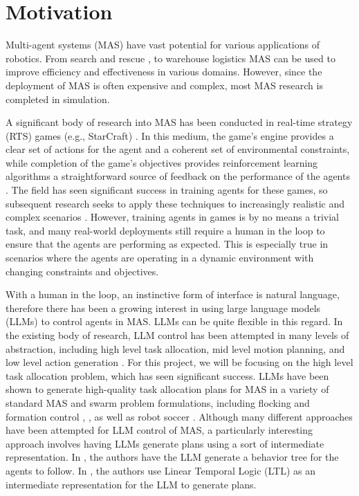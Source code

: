 \section{Motivation}

Multi-agent systems (MAS) have vast potential for various applications of robotics.  From search and rescue \cite{drew_multi-agent_2021}, to warehouse logistics \cite{dusadeerungsikul_multi-agent_2022} MAS can be used to improve efficiency and effectiveness in various domains.  However, since the deployment of MAS is often expensive and complex, most MAS research is completed in simulation.

A significant body of research into MAS has been conducted in real-time strategy (RTS) games (e.g., StarCraft) \cite{jensen_andreas_schmidt_interfacing_2015}.  In this medium, the game's engine provides a clear set of actions for the agent and a coherent set of environmental constraints, while completion of the game's objectives provides reinforcement learning algorithms a straightforward source of feedback on the performance of the agents \cite{zhou_hierarchical_2021}.  The field has seen significant success in training agents for these games, so subsequent research seeks to apply these techniques to increasingly realistic and complex scenarios \cite{goecks_games_2023}.  However, training agents in games is by no means a trivial task, and many real-world deployments still require a human in the loop to ensure that the agents are performing as expected.  This is especially true in scenarios where the agents are operating in a dynamic environment with changing constraints and objectives.

With a human in the loop, an instinctive form of interface is natural language, therefore there has been a growing interest in using large language models (LLMs) to control agents in MAS.  LLMs can be quite flexible in this regard.  In the existing body of research, LLM control has been attempted in many levels of abstraction, including high level task allocation, mid level motion planning, and low level action generation \cite{li_large_2026}.  For this project, we will be focusing on the high level task allocation problem, which has seen significant success.  LLMs have been shown to generate high-quality task allocation plans for MAS in a variety of standard MAS and swarm problem formulations, including flocking and formation control \cite{wang_decentralized_2026}, \cite{eumi_swarmchat_2026}, \cite{ji_genswarm_2026} as well as robot soccer \cite{brienza_llcoach_2025}.  Although many different approaches have been attempted for LLM control of MAS, a particularly interesting approach involves having LLMs generate plans using a sort of intermediate representation.  In \cite{majid_commandswarm_2026}, the authors have the LLM generate a behavior tree for the agents to follow.  In \cite{xu_nl2hltl2plan_2025}, the authors use Linear Temporal Logic (LTL) as an intermediate representation for the LLM to generate plans.


